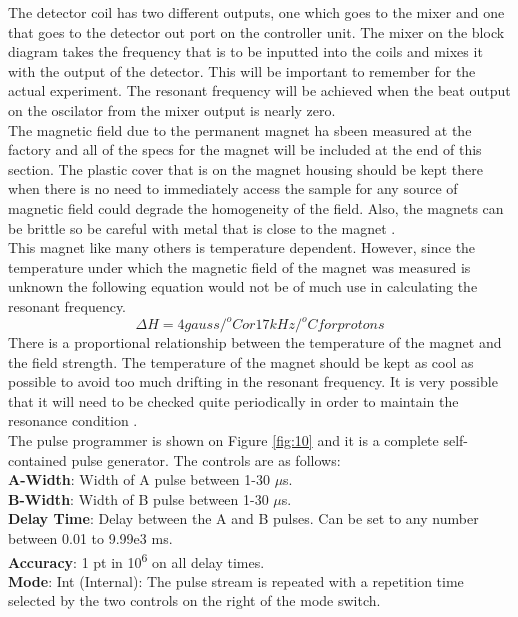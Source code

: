 \documentclass{article}
\begin{document}
{\begin{multicols}{2}
\label{fig:9}
\justify
The detector coil has two different outputs, one which goes to the mixer and 
one that goes to the detector out port on the controller unit. The mixer on the 
block diagram takes the frequency that is to be inputted into the coils and 
mixes it with the output of the detector. This will be important to remember 
for the actual experiment. The resonant frequency will be achieved when the 
beat output on the oscilator from the mixer output is nearly zero.
\\
The magnetic field due to the permanent magnet ha sbeen measured at the factory 
and all of the specs for the magnet will be included at the end of this 
section. The plastic cover that is on the magnet housing should be kept there when there is no need to immediately access the sample for any source of magnetic field could degrade the homogeneity of the field. Also, the magnets can be 
brittle so be careful with metal that is close to the magnet \cite{ref:2}.
\\
This magnet like many others is temperature dependent. However, since the 
temperature under which the magnetic field of the magnet was measured is 
unknown the following equation would not be of much use in calculating the 
resonant frequency.
\begin{equation}
\Delta H = 4gauss/^o C or 17kHz/^o C for protons
\end{equation}
There is a proportional relationship between the temperature of the magnet and 
the field strength. The temperature of the magnet should be kept as cool as 
possible to avoid too much drifting in the resonant frequency. It is very 
possible that it will need to be checked quite periodically in order to 
maintain the resonance condition \cite{ref:2}.
\\
The pulse programmer is shown on Figure \ref{fig:10} and it is a complete 
self-contained pulse generator. The controls are as follows: \\
\textbf{A-Width}: Width of A pulse between 1-30 $\mu$s. \\
\textbf{B-Width}: Width of B pulse between 1-30 $\mu$s. \\
\textbf{Delay Time}: Delay between the A and B pulses. Can be set to any number 
between 0.01 to 9.99e3 ms. \\
\textbf{Accuracy}: 1 pt in 10\textsuperscript{6} on all delay times. \\
\textbf{Mode}: Int (Internal): The pulse stream is repeated with a repetition time selected by the two controls on the right of the mode switch. \\

\end{multicols}}
\end{document}
